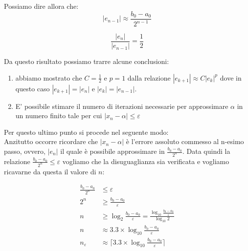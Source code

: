 \documentclass[12pt, a4paper]{book}
\theoremstyle{definition}
\begin{document}
\begin{flushleft}
Possiamo dire allora che: 
\[ 
	|e_{n-1}| \approx \frac{b_{0} - a_{0}}{2^{n-1}} 
\]

\[ 
	\dfrac{|e_{n}| }{|e_{n-1}| } = \frac{1}{2}
\]

Da questo risultato possiamo trarre alcune conclusioni: 
\begin{enumerate}
	\item abbiamo mostrato che $C = \frac{1}{2}$ e $p = 1$ dalla relazione $|e_{k+1}| \approx C|e_{k}|^{p}$ dove in questo caso $|e_{k+1}| = |e_{n}| $ e $|e_{k}| = |e_{n-1}| $.
	\item E' possibile stimare il numero di iterazioni necessarie per approssimare $\alpha$ in un numero finito tale per cui $|x_{n} - \alpha| \leq \varepsilon$
\end{enumerate}

Per questo ultimo punto si procede nel seguente modo:\\
Anzitutto occorre ricordare che $|x_{n} - \alpha|$ è l'errore assoluto commesso al n-esimo passo,  ovvero, $|e_{n}|$ il quale è possibile approssimare in  $ \frac{b_{0} - a_{0}}{2^{n}}$.  Data quindi la relazione $ \frac{b_{0} - a_{0}}{2^{n}} \leq \varepsilon$ vogliamo che la disuguaglianza sia verificata e vogliamo ricavarne da questa il valore di $n$:

\begin{equation}
	\begin{split}
		 \frac{b_{0} - a_{0}}{2^{n}} & \leq \varepsilon \\
		 2^{n} & \geq  \frac{b_{0} - a_{0}}{\varepsilon} \\
		 n & \geq \log_{2}  \frac{b_{0} - a_{0}}{\varepsilon} = \frac{ \log_{10} \frac{b_{0} - a_{0}}{\varepsilon} }{ \log_{10} 2} \\
		 n & \approx 3.3 \times  \log_{10} \frac{b_{0} - a_{0}}{\varepsilon} \\
		 n_{\varepsilon} & \approx \lceil 3.3 \times  \log_{10} \frac{b_{0} - a_{0}}{\varepsilon} \rceil
	\end{split}
\end{equation}
\end{flushleft}
\end{document}
